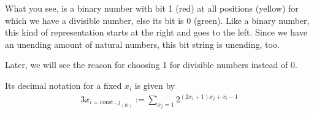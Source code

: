 What you see, is a binary number with bit 1 (red) at all positions (yellow) for which we have a divisible number, else its bit is 0 (green). Like a binary number, this kind of representation starts at the right and goes to the left. Since we have an unending amount of natural numbers, this bit string is unending, too.

\vspace{0.3cm}
Later, we will see the reason for choosing 1 for divisible numbers instead of 0.

\vspace{0.3cm}
Its decimal notation for a fixed $x_{i}$ is given by
\begin{alignat}{3}
	x_{i=\mathrm{const.},j_{\left(10\right)}} := \sum_{x_{j} = 1} 2^{\left(2x_{i} + 1\right)x_{j} + x_{i} - 1} 
\label{eq:bitstringdec}\end{alignat} 












